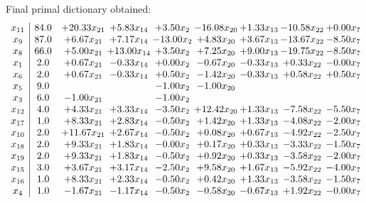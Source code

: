 \documentclass[8pt]{article}
\begin{document}
 Final primal dictionary obtained: 
\[\begin{array}{c| c c@{\hskip 2pt} c@{\hskip 2pt} c@{\hskip 2pt} c@{\hskip 2pt} c@{\hskip 2pt} c@{\hskip 2pt} c@{\hskip 2pt} }
 x_{11}   &  84.0 & + 20.33 x_{21} & +  5.83 x_{14} & +  3.50 x_{2} & -16.08 x_{20} & +  1.33 x_{13} & -10.58 x_{22} & +  0.00 x_{7}\\
 x_{9}   &  87.0 & +  6.67 x_{21} & +  7.17 x_{14} & -13.00 x_{2} & +  4.83 x_{20} & +  3.67 x_{13} & -13.67 x_{22} & -8.50 x_{7}\\
 x_{8}   &  66.0 & +  5.00 x_{21} & + 13.00 x_{14} & +  3.50 x_{2} & +  7.25 x_{20} & +  9.00 x_{13} & -19.75 x_{22} & -8.50 x_{7}\\
 x_{1}   &  2.0 & +  0.67 x_{21} & -0.33 x_{14} & +  0.00 x_{2} & -0.67 x_{20} & -0.33 x_{13} & +  0.33 x_{22} & -0.00 x_{7}\\
 x_{6}   &  2.0 & +  0.67 x_{21} & -0.33 x_{14} & +  0.50 x_{2} & -1.42 x_{20} & -0.33 x_{13} & +  0.58 x_{22} & +  0.50 x_{7}\\
 x_{5}   &  9.0  &    &   & -1.00 x_{2} & -1.00 x_{20} &    &    &   \\
 x_{3}   &  6.0 & -1.00 x_{21} &   & -1.00 x_{2} &    &    &    &   \\
 x_{12}   &  4.0 & +  4.33 x_{21} & +  3.33 x_{14} & -3.50 x_{2} & + 12.42 x_{20} & +  1.33 x_{13} & -7.58 x_{22} & -5.50 x_{7}\\
 x_{17}   &  1.0 & +  8.33 x_{21} & +  2.83 x_{14} & -0.50 x_{2} & +  1.42 x_{20} & +  1.33 x_{13} & -4.08 x_{22} & -2.00 x_{7}\\
 x_{10}   &  2.0 & + 11.67 x_{21} & +  2.67 x_{14} & -0.50 x_{2} & +  0.08 x_{20} & +  0.67 x_{13} & -4.92 x_{22} & -2.50 x_{7}\\
 x_{18}   &  2.0 & +  9.33 x_{21} & +  1.83 x_{14} & -0.00 x_{2} & +  0.17 x_{20} & +  0.33 x_{13} & -3.33 x_{22} & -1.50 x_{7}\\
 x_{19}   &  2.0 & +  9.33 x_{21} & +  1.83 x_{14} & -0.50 x_{2} & +  0.92 x_{20} & +  0.33 x_{13} & -3.58 x_{22} & -2.00 x_{7}\\
 x_{15}   &  3.0 & +  3.67 x_{21} & +  3.17 x_{14} & -2.50 x_{2} & +  9.58 x_{20} & +  1.67 x_{13} & -5.92 x_{22} & -4.00 x_{7}\\
 x_{16}   &  1.0 & +  8.33 x_{21} & +  2.33 x_{14} & -0.50 x_{2} & +  0.42 x_{20} & +  1.33 x_{13} & -3.58 x_{22} & -1.50 x_{7}\\
 x_{4}   &  1.0 & -1.67 x_{21} & -1.17 x_{14} & -0.50 x_{2} & -0.58 x_{20} & -0.67 x_{13} & +  1.92 x_{22} & -0.00 x_{7}\\

\end{array}\]
\end{document}
